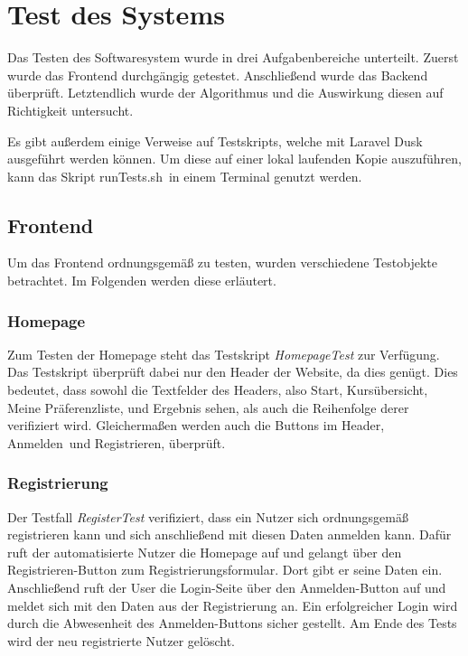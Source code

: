 \chapter{Test des Systems}
\label{chapter:testing}

	Das Testen des Softwaresystem wurde in drei Aufgabenbereiche unterteilt.
	Zuerst wurde das Frontend durchgängig getestet.
	Anschließend wurde das Backend überprüft.
	Letztendlich wurde der Algorithmus und die Auswirkung diesen auf Richtigkeit untersucht.\newline
	
	Es gibt außerdem einige Verweise auf Testskripts, welche mit Laravel Dusk ausgeführt werden können.
	Um diese auf einer lokal laufenden Kopie auszuführen, kann das Skript \glqq runTests.sh\grqq~in einem Terminal genutzt werden.\newline
	
	\section{Frontend}
		Um das Frontend ordnungsgemäß zu testen, wurden verschiedene Testobjekte betrachtet.
		Im Folgenden werden diese erläutert.
		
		\subsection{Homepage}
			Zum Testen der Homepage steht das Testskript \textit{HomepageTest} zur Verfügung.
			Das Testskript überprüft dabei nur den Header der Website, da dies genügt.
			Dies bedeutet, dass sowohl die Textfelder des Headers, also \glqq Start\grqq, \glqq Kursübersicht\grqq, \glqq Meine Präferenzliste\grqq, und \glqq Ergebnis sehen\grqq, als auch die Reihenfolge derer verifiziert wird.
			Gleichermaßen werden auch die Buttons im Header, \glqq Anmelden\grqq~und \glqq Registrieren\grqq, überprüft.\newline
		
		\subsection{Registrierung}
			Der Testfall \textit{RegisterTest} verifiziert, dass ein Nutzer sich ordnungsgemäß registrieren kann und sich anschließend mit diesen Daten anmelden kann.
			Dafür ruft der automatisierte Nutzer die Homepage auf und gelangt über den \glqq Registrieren\grqq -Button zum Registrierungsformular.
			Dort gibt er seine Daten ein.
			Anschließend ruft der User die Login-Seite über den \glqq Anmelden\grqq -Button auf und meldet sich mit den Daten aus der Registrierung an. \newline
			Ein erfolgreicher Login wird durch die Abwesenheit des \glqq Anmelden\grqq -Buttons sicher gestellt.
			Am Ende des Tests wird der neu registrierte Nutzer gelöscht.\newline
		
